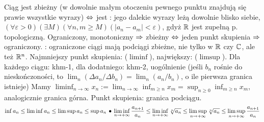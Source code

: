Ciąg  jest zbieżny (w dowolnie małym otoczeniu pewnego punktu znajdują się prawie wszystkie wyrazy) $\Leftrightarrow$ jest : jego dalekie wyrazy leżą dowolnie blisko siebie, $(\forall \varepsilon > 0)(\exists M)(\forall n,m \ge M)(|a_n-a_m|<\varepsilon)$, gdyż $\mathbb{R}$ jest zupełną p. topologiczną.
Ograniczony, monotoniczny $\Rightarrow$ zbieżny $\Leftrightarrow$ jeden punkt skupienia $\Rightarrow$ ograniczony.
: ograniczone ciągi mają podciągi zbieżne, nie tylko w $\mathbb{R}$ czy $\mathbb{C}$, ale też $\mathbb{R}^n$.
Najmniejszy punkt skupienia:  ($\liminf$), największy:  ($\limsup$).
Dla każdego ciągu: khm-1, dla dodatniego: khm-2, uogólnienie  (jeśli $b_n$ rośnie do nieskończoności, to $\lim_n (\Delta a_n / \Delta b_n) = \lim_n (a_n / b_n) $, o ile pierwsza granica istnieje)
Mamy $\liminf_{n \to \infty} x_n := \lim_{n\to\infty} \inf_{m \ge n} x_m = \sup_{n \ge 0} \inf_{m \ge n} x_m$, analogicznie granica górna.
Punkt skupienia: granica podciągu.
\[
	\inf a_n \le \liminf a_n\le \limsup a_n \le \sup a_n \, \bullet \,
	\liminf\limits_{n\rightarrow+\infty}\frac{a_{n+1}}{a_n} \le
	\liminf\limits_{n\rightarrow+\infty} \sqrt[n]{a_n} \le
	\limsup\limits_{n\rightarrow+\infty} \sqrt[n]{a_n} \le
	\limsup\limits_{n\rightarrow+\infty}\frac{a_{n+1}}{a_n}
\]

